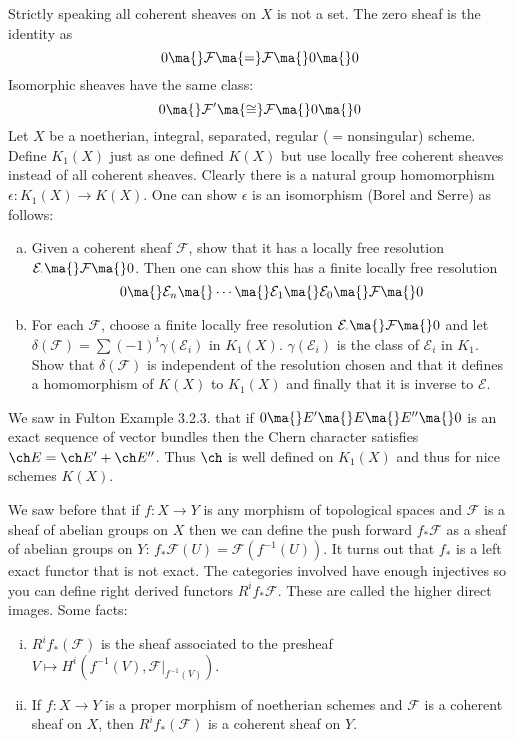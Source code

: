 Strictly speaking all coherent sheaves on $X$ is not a set. The zero sheaf is the identity as
	\[
	0 \ma{} \mathcal{F} \ma{=} \mathcal{F} \ma{} 0 \ma{} 0
	\]
Isomorphic sheaves have the same class:
	\[
	0 \ma{} \mathcal{F}' \ma{\cong} \mathcal{F} \ma{} 0 \ma{} 0
	\]
Let $X$ be a noetherian, integral, separated, regular ($=$nonsingular) scheme. Define $K_1(X)$ just as one defined $K(X)$ but use locally free coherent sheaves instead of all coherent sheaves. Clearly there is a natural group homomorphism $\epsilon: K_1(X) \to K(X)$. One can show $\epsilon$ is an isomorphism (Borel and Serre) as follows:
\begin{enumerate}[(a)]
\item Given a coherent sheaf $\mathcal{F}$, show that it has a locally free resolution $\mathcal{E}_\cdot \ma{} \mathcal{F} \ma{} 0$. Then one can show this has a finite locally free resolution
	\[
	0 \ma{} \mathcal{E}_n \ma{} \cdots \ma{} \mathcal{E}_1 \ma{} \mathcal{E}_0 \ma{} \mathcal{F} \ma{} 0
	\]
\item For each $\mathcal{F}$, choose a finite locally free resolution $\mathcal{E}_\cdot \ma{} \mathcal{F} \ma{} 0$ and let $\delta(\mathcal{F})=\sum (-1)^i \gamma(\mathcal{E}_i)$ in $K_1(X)$. $\gamma(\mathcal{E}_i)$ is the class of $\mathcal{E}_i$ in $K_1$. Show that $\delta(\mathcal{F})$ is independent of the resolution chosen and that it defines a homomorphism of $K(X)$ to $K_1(X)$ and finally that it is inverse to $\mathcal{E}$.
\end{enumerate}


We saw in Fulton Example 3.2.3. that if $0 \ma{} E' \ma{} E \ma{} E'' \ma{} 0$ is an exact sequence of vector bundles then the Chern character satisfies $\ch E = \ch E' + \ch E''$. Thus $\ch$ is well defined on $K_1(X)$ and thus for nice schemes $K(X)$. 


We saw before that if $f: X \to Y$ is any morphism of topological spaces and $\mathcal{F}$ is a sheaf of abelian groups on $X$ then we can define the push forward $f_*\mathcal{F}$ as a sheaf of abelian groups on $Y$: $f_*\mathcal{F}(U)=\mathcal{F}(f^{-1}(U))$. It turns out that $f_*$ is a left exact functor that is not exact. The categories involved have enough injectives so you can define right derived functors $R^if_*\mathcal{F}$. These are called the higher direct images. Some facts:
\begin{enumerate}[(i)]
\item $R^if_*(\mathcal{F})$ is the sheaf associated to the presheaf $V \mapsto H^i(f^{-1}(V), \mathcal{F}\big|_{f^{-1}(V)})$.
\item If $f: X \to Y$ is a proper morphism of noetherian schemes and $\mathcal{F}$ is a coherent sheaf on $X$, then $R^if_*(\mathcal{F})$ is a coherent sheaf on $Y$. 
\end{enumerate}

